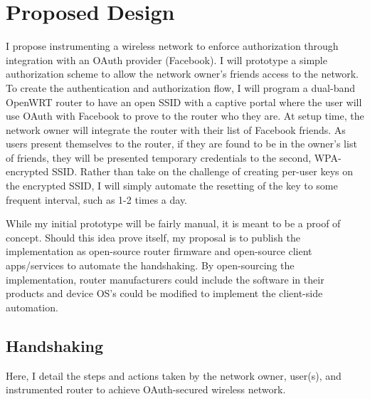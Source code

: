 \section{Proposed Design}
\label{section:propeseddesign}
I propose instrumenting a wireless network to enforce authorization through integration with an
OAuth provider (Facebook). I will prototype a simple authorization scheme to allow the network
owner's friends access to the network. To create the authentication and authorization flow, I will
program a dual-band OpenWRT router to have an open SSID with a captive portal where the user will
use OAuth with Facebook to prove to the router who they are. At setup time, the network owner will
integrate the router with their list of Facebook friends. As users present themselves to the router,
if they are found to be in the owner's list of friends, they will be presented temporary credentials
to the second, WPA-encrypted SSID. Rather than take on the challenge of creating per-user keys on
the encrypted SSID, I will simply automate the resetting of the key to some frequent interval, such
as 1-2 times a day.

While my initial prototype will be fairly manual, it is meant to be a proof of concept. Should this
idea prove itself, my proposal is to publish the implementation as open-source router firmware and
open-source client apps/services to automate the handshaking. By open-sourcing the implementation,
router manufacturers could include the software in their products and device OS's could be modified
to implement the client-side automation.

\subsection{Handshaking}
Here, I detail the steps and actions taken by the network owner, user(s), and instrumented router to
achieve OAuth-secured wireless network.

